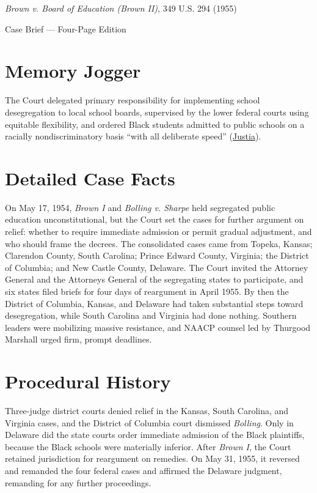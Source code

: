 \documentclass[12pt]{article}
\begin{document}
\begin{center}
{\LARGE \textit{Brown v. Board of Education (Brown II)}, 349 U.S. 294 (1955)\par}
\vspace{0.8em}
{\large Case Brief --- Four-Page Edition\par}
\end{center}
\vspace{1em}

\section{Memory Jogger}

The Court delegated primary responsibility for implementing school desegregation to local school boards, supervised by the lower federal courts using equitable flexibility, and ordered Black students admitted to public schools on a racially nondiscriminatory basis ``with all deliberate speed'' (\href{https://supreme.justia.com/cases/federal/us/349/294/}{Justia}).

\section{Detailed Case Facts}

On May 17, 1954, \textit{Brown I} and \textit{Bolling v. Sharpe} held segregated public education unconstitutional, but the Court set the cases for further argument on relief: whether to require immediate admission or permit gradual adjustment, and who should frame the decrees. The consolidated cases came from Topeka, Kansas; Clarendon County, South Carolina; Prince Edward County, Virginia; the District of Columbia; and New Castle County, Delaware. The Court invited the Attorney General and the Attorneys General of the segregating states to participate, and six states filed briefs for four days of reargument in April 1955. By then the District of Columbia, Kansas, and Delaware had taken substantial steps toward desegregation, while South Carolina and Virginia had done nothing. Southern leaders were mobilizing massive resistance, and NAACP counsel led by Thurgood Marshall urged firm, prompt deadlines.

\section{Procedural History}

Three-judge district courts denied relief in the Kansas, South Carolina, and Virginia cases, and the District of Columbia court dismissed \textit{Bolling}. Only in Delaware did the state courts order immediate admission of the Black plaintiffs, because the Black schools were materially inferior. After \textit{Brown I}, the Court retained jurisdiction for reargument on remedies. On May 31, 1955, it reversed and remanded the four federal cases and affirmed the Delaware judgment, remanding for any further proceedings.
\end{document}

